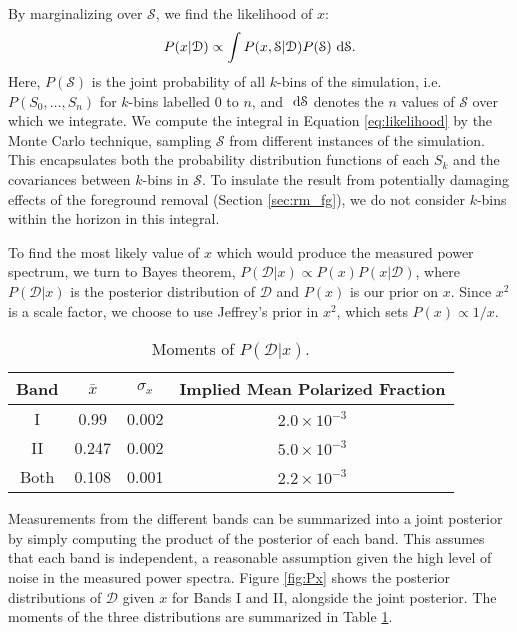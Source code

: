 By marginalizing over $\mathcal{S}$, we find the likelihood of $x$:
\begin{equation}
  P(x|\mathcal{D}) \propto \int P(x,\mathcal{S}|\mathcal{D})P(\mathcal{S})\ \mathrm{d}\mathcal{S}.
  \label{eq:likelihood}
\end{equation}
Here, $P(\mathcal{S})$ is the joint probability of all $k$-bins of the simulation, i.e. $P(S_0,
\dots, S_n)$ for $k$-bins labelled 0 to $n$, and $\ \mathrm{d}\mathcal{S}$ denotes the $n$ values of
$\mathcal{S}$ over which we integrate. We compute the integral in Equation \ref{eq:likelihood} 
by the Monte Carlo technique, sampling $\mathcal{S}$ from different instances of the simulation. 
This encapsulates both the probability distribution functions of each $S_k$ and the covariances 
between $k$-bins in $\mathcal{S}$. To insulate the result from potentially damaging effects of 
the foreground removal (Section \ref{sec:rm_fg}), we do not consider $k$-bins within the horizon 
in this integral. 

To find the most likely value of $x$ which would produce the measured power spectrum, we turn to
Bayes theorem, $P(\mathcal{D}|x) \propto P(x)P(x|\mathcal{D})$, where $P(\mathcal{D}|x)$ is the
posterior distribution of $\mathcal{D}$ and $P(x)$ is our prior on $x$. Since $x^2$ is a scale
factor, we choose to use Jeffrey's prior in $x^2$, which sets $P(x) \propto 1/x$.

\begin{table}\begin{center}
  \begin{tabular}{ c c c c }
    Band & $\bar{x}$ & $\sigma_x$ & Implied Mean Polarized Fraction 
    \\
    \hline\hline
    I & 0.99 & 0.002 & $2.0\times10^{-3}$
    \\
    II & 0.247 & 0.002 & $5.0\times10^{-3}$
    \\
    Both & 0.108 & 0.001 & $2.2\times10^{-3}$
  \end{tabular}
  \caption{\label{tab:x}Moments of $P(\mathcal{D}|x)$.}
\end{center}\end{table}
Measurements from the different bands can be summarized into a joint posterior by simply computing
the product of the posterior of each band. This assumes that each band is independent, a reasonable
assumption given the high level of noise in the measured power spectra. Figure \ref{fig:Px} shows
the posterior distributions of $\mathcal{D}$ given $x$ for Bands I and II, alongside the joint posterior. 
The moments of the three distributions are summarized in Table \ref{tab:x}.

